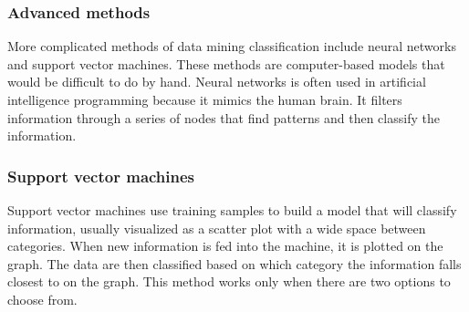 \subsubsection*{Advanced methods}
More complicated methods of data mining classification include neural networks and support vector machines. These methods are computer-based models that would be difficult to do by hand. Neural networks is often used in artificial intelligence programming because it mimics the human brain. It filters information through a series of nodes that find patterns and then classify the information.

\subsubsection*{Support vector machines }
Support vector machines use training samples to build a model that will classify information, usually visualized as a scatter plot with a wide space between categories. When new information is fed into the machine, it is plotted on the graph. The data are then classified based on which category the information falls closest to on the graph. This method works only when there are two options to choose from.


